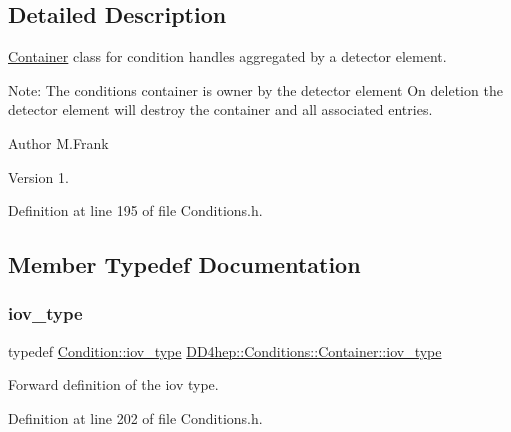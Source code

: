 \subsection{Detailed Description}
\hyperlink{class_d_d4hep_1_1_conditions_1_1_container}{Container} class for condition handles aggregated by a detector element. 

Note\+: The conditions container is owner by the detector element On deletion the detector element will destroy the container and all associated entries.

\begin{DoxyAuthor}{Author}
M.\+Frank 
\end{DoxyAuthor}
\begin{DoxyVersion}{Version}
1. 
\end{DoxyVersion}


Definition at line 195 of file Conditions.\+h.



\subsection{Member Typedef Documentation}
\hypertarget{class_d_d4hep_1_1_conditions_1_1_container_a169b09fd183c9e05faf63429bad6c668}{}\label{class_d_d4hep_1_1_conditions_1_1_container_a169b09fd183c9e05faf63429bad6c668} 
\subsubsection{\texorpdfstring{iov\+\_\+type}{iov\_type}}
{\footnotesize\ttfamily typedef \hyperlink{class_d_d4hep_1_1_conditions_1_1_condition_ad84300e226b2085ec5e9db7f47be5539}{Condition\+::iov\+\_\+type} \hyperlink{class_d_d4hep_1_1_conditions_1_1_container_a169b09fd183c9e05faf63429bad6c668}{D\+D4hep\+::\+Conditions\+::\+Container\+::iov\+\_\+type}}



Forward definition of the iov type. 



Definition at line 202 of file Conditions.\+h.

\hypertarget{class_d_d4hep_1_1_conditions_1_1_container_a65e62d9e4a43b9b0e9e46a7b80876a21}{}\label{class_d_d4hep_1_1_conditions_1_1_container_a65e62d9e4a43b9b0e9e46a7b80876a21} 
